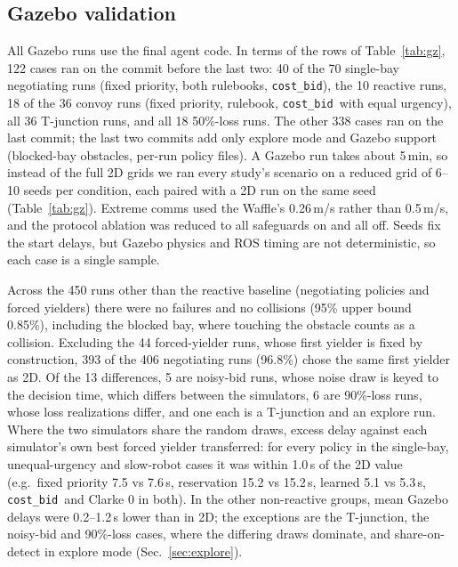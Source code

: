 \documentclass[letterpaper,journal]{IEEEtran}
\newcommand{\cb}{\texttt{cost\_bid}}
\begin{document}
\subsection{Gazebo validation}\label{sec:gz}
All Gazebo runs use the final agent code. In terms of the rows of Table~\ref{tab:gz}, 122 cases ran on the commit before the last two: 40 of the 70 single-bay negotiating runs (fixed priority, both rulebooks, \cb), the 10 reactive runs, 18 of the 36 convoy runs (fixed priority, rulebook, \cb\ with equal urgency), all 36 T-junction runs, and all 18 50\%-loss runs. The other 338 cases ran on the last commit; the last two commits add only explore mode and Gazebo support (blocked-bay obstacles, per-run policy files). A Gazebo run takes about 5\,min, so instead of the full 2D grids we ran every study's scenario on a reduced grid of 6--10 seeds per condition, each paired with a 2D run on the same seed (Table~\ref{tab:gz}). Extreme comms used the Waffle's 0.26\,m/s rather than 0.5\,m/s, and the protocol ablation was reduced to all safeguards on and all off. Seeds fix the start delays, but Gazebo physics and ROS timing are not deterministic, so each case is a single sample.

Across the 450 runs other than the reactive baseline (negotiating policies and forced yielders) there were no failures and no collisions (95\% upper bound 0.85\%), including the blocked bay, where touching the obstacle counts as a collision. Excluding the 44 forced-yielder runs, whose first yielder is fixed by construction, 393 of the 406 negotiating runs (96.8\%) chose the same first yielder as 2D. Of the 13 differences, 5 are noisy-bid runs, whose noise draw is keyed to the decision time, which differs between the simulators, 6 are 90\%-loss runs, whose loss realizations differ, and one each is a T-junction and an explore run. Where the two simulators share the random draws, excess delay against each simulator's own best forced yielder transferred: for every policy in the single-bay, unequal-urgency and slow-robot cases it was within 1.0\,s of the 2D value (e.g.\ fixed priority 7.5 vs 7.6\,s, reservation 15.2 vs 15.2\,s, learned 5.1 vs 5.3\,s, \cb\ and Clarke 0 in both). In the other non-reactive groups, mean Gazebo delays were 0.2--1.2\,s lower than in 2D; the exceptions are the T-junction, the noisy-bid and 90\%-loss cases, where the differing draws dominate, and share-on-detect in explore mode (Sec.~\ref{sec:explore}).
\end{document}
